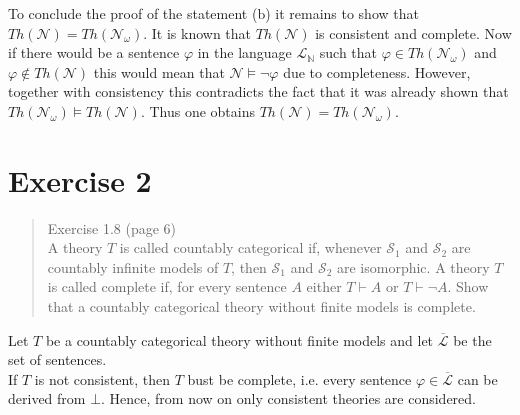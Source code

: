 \documentclass[11pt,a4paper]{article}
\newcommand{\derives}{\vdash}
\begin{document}
To conclude the proof of the statement (b) it remains to show that $Th(\mathcal{N})=Th(\mathcal{N}_{\omega})$. It is known that $Th(\mathcal{N})$ is consistent and complete. Now if there would be a sentence $\varphi$ in the language $\mathcal{L}_{\mathbb{N}}$ such that $\varphi \in Th(\mathcal{N}_{\omega})$ and $\varphi \nin Th(\mathcal{N})$ this would mean that $\mathcal{N} \models \neg \varphi$ due to completeness. However, together with consistency this contradicts the fact that it was already shown that $Th(\mathcal{N}_{\omega})\models Th(\mathcal{N})$. Thus one obtains $Th(\mathcal{N})=Th(\mathcal{N}_{\omega})$.


\section*{Exercise 2}
\begin{quote}
Exercise 1.8 (page 6)\\
A theory $T$ is called countably categorical if, whenever $\mathcal{S}_1$ and $\mathcal{S}_2$ are countably infinite models of $T$, then $\mathcal{S}_1$ and $\mathcal{S}_2$ are isomorphic.
A theory $T$ is called complete if, for every sentence $A$ either $T \derives A$ or $ T \derives \neg A $.
Show that a countably categorical theory without finite models is complete.
\end{quote}

Let $T$ be a countably categorical theory without finite models and let $\overline{\mathcal{L}}$ be the set of sentences.\\

If $T$ is not consistent, then $T$ bust be complete, i.e. every sentence $\varphi \in \overline{\mathcal{L}}$ can be derived from $\bot$. Hence, from now on only consistent theories are considered. \\
\end{document}
